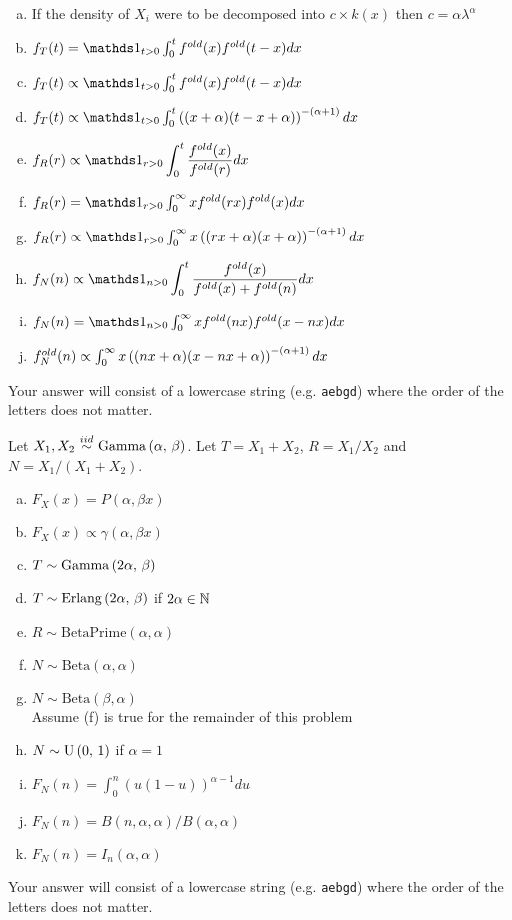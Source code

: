 \documentclass[12pt,landscape]{article}
\newcommand{\instr}{\small Your answer will consist of a lowercase string (e.g. \texttt{aebgd}) where the order of the letters does not matter. \normalsize}
\begin{document}
\begin{enumerate}[(a)]
\item If the density of $X_i$ were to be decomposed into $c \times  k(x)$ then $c = \alpha\lambda^\alpha$
\item $f_T(t) = \indic{t>0} \int_0^t f^{old}(x) f^{old}(t-x) dx$
\item $f_T(t) \propto \indic{t>0} \int_0^t f^{old}(x) f^{old}(t-x) dx$
\item $f_T(t) \propto \indic{t>0} \int_0^t \tothepow{(x + \alpha)(t - x + \alpha)}{-(\alpha + 1)} dx$

\item $f_R(r)  \propto \indic{r>0}\displaystyle \int_0^t \displaystyle\frac{f^{old}(x)}{f^{old}(r)} dx$
\item $f_R(r) = \indic{r>0} \int_0^\infty x f^{old}(rx) f^{old}(x)  dx$
\item $f_R(r) \propto \indic{r>0} \int_0^\infty x \tothepow{(rx + \alpha)(x + \alpha)}{-(\alpha + 1)}  dx$

\item $f_N(n)  \propto \indic{n>0}\displaystyle \int_0^t \displaystyle\frac{f^{old}(x)}{f^{old}(x) + f^{old}(n)} dx$
\item $f_N(n) = \indic{n>0} \int_0^\infty x f^{old}(nx) f^{old}(x - nx)  dx$
\item $f^{old}_N(n) \propto  \int_0^\infty x \left((nx + \alpha)(x - nx + \alpha)\right)^{-(\alpha + 1)}  dx$
\end{enumerate}
\eenum\instr\pagebreak








\problem{} Let $X_1, X_2 \iid \gammanot{\alpha}{\beta}$. Let $T = X_1 + X_2$, $R = X_1 / X_2$ and $N = X_1 / (X_1 +  X_2)$.

\vspace{-0.2cm}\benum{} 

\begin{enumerate}[(a)]
\item $F_X(x) = P(\alpha, \beta x)$
\item $F_X(x) \propto \gamma(\alpha, \beta x)$
\item $T \sim \mathrm{Gamma}\left(2\alpha,\,\beta\right)$
\item $T \sim \mathrm{Erlang}\left(2\alpha,\,\beta\right)$ if $2\alpha \in \mathbb{N}$
\item $R \sim \text{BetaPrime}(\alpha, \alpha)$
\item $N \sim \text{Beta}(\alpha, \alpha)$
\item $N \sim \text{Beta}(\beta, \alpha)$ \\

Assume (f) is true for the remainder of this problem
\item $N \sim \mathrm{U}\left(0,\,1\right)$ if $\alpha = 1$
\item $F_N(n) = \int_0^n (u(1-u))^{\alpha - 1} du$
\item $F_N(n) = B(n, \alpha, \alpha) / B(\alpha, \alpha)$
\item $F_N(n) = I_n (\alpha, \alpha)$
\end{enumerate}
\eenum\instr\pagebreak
\end{document}
